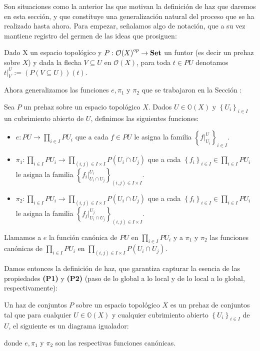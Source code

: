 Son situaciones como la anterior las que motivan la definición de haz que daremos en esta sección, y que constituye una generalización natural del proceso que se ha realizado hasta ahora. Para empezar, señalamos algo de notación, que a su vez mantiene registro del germen de las ideas que prosiguen:
\begin{Not}
Dado X un espacio topológico y ${P:\mathcal{O}(X)}^{op}\to\normalfont{\textbf{Set}}$ un funtor (es decir un prehaz sobre $X$) y dada la flecha $V\subseteq U$ en $\mathcal{O}(X)$, para toda $t\in PU$ denotamos $t|^{U}_{V}:=(P(V\subseteq U))(t)$.
\end{Not}
Ahora generalizamos las funciones $e,\pi_1$ y $\pi_2$ que se trabajaron en la Sección :
\begin{Def}
   Sea $P$ un prehaz sobre un espacio topológico $X$. Dados $U\in\mathbb{O}(X)$ y $\left\lbrace U_i\right\rbrace_{i\in I}$ un cubrimiento abierto de $U$, definimos las siguientes funciones:
   \begin{itemize}
      \item $e:PU\to \prod_{i\in I}PU_i$ que a cada $f\in PU$ le asigna la familia $\left\lbrace f|^{U}_{U_i}\right\rbrace_{i\in I}$.
      \item $\pi_1:\prod_{i\in I}PU_i\to \prod_{(i,j)\in I\times I}P(U_i\cap U_j)$ que a cada $\left\lbrace f_i\right\rbrace_{i\in I}\in\prod_{i\in I}PU_i$ le asigna la familia $\left\lbrace {f_i}|^{U_i}_{U_i\cap U_j}\right\rbrace_{(i,j)\in I\times I}$.
      \item $\pi_2:\prod_{i\in I}PU_i\to \prod_{(i,j)\in I\times I}P(U_i\cap U_j)$ que a cada $\left\lbrace f_i\right\rbrace_{i\in I}\in\prod_{i\in I}PU_i$ le asigna la familia $\left\lbrace {f_j}|^{U_j}_{U_i\cap U_j}\right\rbrace_{(i,j)\in I\times I}$.
   \end{itemize}
   Llamamos a $e$ la función canónica de $PU$ en $\prod_{i\in I}PU_i$ y a $\pi_1$ y $\pi_2$ las funciones canónicas de $\prod_{i\in I}PU_i$ en $\prod_{(i,j)\in I\times I}P(U_i\cap U_j)$.
\end{Def}
Damos entonces la definición de haz, que garantiza capturar la esencia de las propiedades \textbf{(P1)} y \textbf{(P2)} (paso de lo global a lo local y de lo local a lo global, respectivamente):
\begin{Def}
   Un haz de conjuntos $P$ sobre un espacio topológico $X$ es un prehaz de conjuntos tal que para cualquier $U\in \mathbb{O}(X)$ y cualquier cubrimiento abierto $\left\lbrace U_i\right\rbrace_{i\in I}$ de $U$, el siguiente es un diagrama igualador:
   
   donde $e,\pi_1$ y $\pi_2$ son las respectivas funciones canónicas.
\end{Def}
